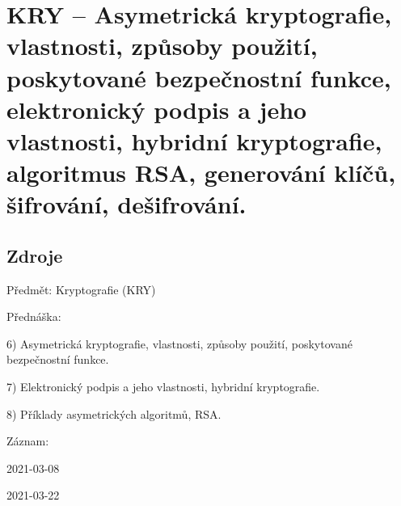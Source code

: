 

\graphicspath{{kry/asymetricka_kryptografie/figures}}


\chapter{KRY -- Asymetrická kryptografie, vlastnosti, způsoby použití, poskytované bezpečnostní funkce, elektronický podpis a jeho vlastnosti, hybridní kryptografie, algoritmus RSA, generování klíčů, šifrování, dešifrování.}



\section{Zdroje}

\begin{compactitem}
    \item Předmět: Kryptografie (KRY)
    \item Přednáška:
    \begin{compactitem}
        \item 6) Asymetrická kryptografie, vlastnosti, způsoby použití, poskytované bezpečnostní funkce.
        \item 7) Elektronický podpis a jeho vlastnosti, hybridní kryptografie.
        \item 8) Příklady asymetrických algoritmů, RSA.
    \end{compactitem}
    \item Záznam:
    \begin{compactitem}
        \item 2021-03-08
        \item 2021-03-22
    \end{compactitem}
\end{compactitem}


